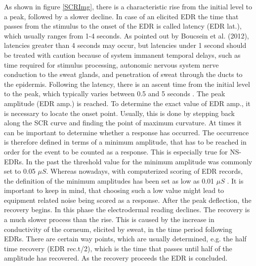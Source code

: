 As shown in figure \ref{SCRImg}, there is a characteristic rise from the initial level to a peak, followed by a slower decline. In case of an elicited EDR the time that passes from the stimulus to the onset of the EDR is called latency (EDR lat.), which usually ranges from 1-4 seconds. As pointed out by Boucsein et al. (2012), latencies greater than 4 seconds may occur, but latencies under 1 second should be treated with caution because of system immanent temporal delays, such as time required for stimulus processing, autonomic nervous system nerve conduction to the sweat glands, and penetration of sweat through the ducts to the epidermis. Following the latency, there is an ascent time from the initial level to the peak, which typically varies between 0.5 and 5 seconds \citep{boucsein2012electrodermal}. The peak amplitude (EDR amp.) is reached. To determine the exact value of EDR amp., it is necessary to locate the onset point. Usually, this is done by stepping back along the SCR curve and finding the point of maximum curvature.
At times it can be important to determine whether a response has occurred. The occurrence is therefore defined in terms of a minimum amplitude, that has to be reached in order for the event to be counted as a response. This is especially true for NS-EDRs. In the past the threshold value for the minimum amplitude was commonly set to 0.05 $\mu S$. Whereas nowadays, with computerized scoring of EDR records, the definition of the minimum amplitudes has been set as low as 0.01 $\mu S$ \cite{EDAGUIDE}. It is important to keep in mind, that choosing such a low value might lead to equipment related noise being scored as a response. After the peak deflection, the recovery begins. In this phase the electrodermal reading declines. The recovery is a much slower process than the rise. This is caused by the increase in conductivity of the corneum, elicited by sweat, in the time period following EDRs. There are certain way points, which are usually determined, e.g. the half time recovery (EDR rec.t/2), which is the time that passes until half of the amplitude has recovered. As the recovery proceeds the EDR is concluded.

